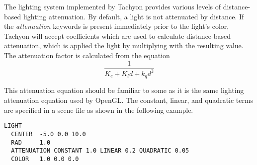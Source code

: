 The lighting system implemented by Tachyon provides various levels of
distance-based lighting attenuation.  By default, a light is not attenuated
by distance.  If the {\em attenuation} keywords is present immediately 
prior to the light's color, Tachyon will accept coefficients which are used 
to calculate distance-based attenuation, which is applied the light by 
multiplying with the resulting value.  The attenuation factor is calculated 
from the equation 
\begin{equation}
\label{eq:attenuation}
  \frac {1} {K_c + K_l d + k_q d^2}
\end{equation}

This attenuation equation should be familiar to some as it 
is the same lighting attenuation equation used by OpenGL.
The constant, linear, and quadratic terms are specified in a scene file
as shown in the following example.
\begin{verbatim}
LIGHT  
  CENTER  -5.0 0.0 10.0   
  RAD     1.0
  ATTENUATION CONSTANT 1.0 LINEAR 0.2 QUADRATIC 0.05
  COLOR   1.0 0.0 0.0  
\end{verbatim}


